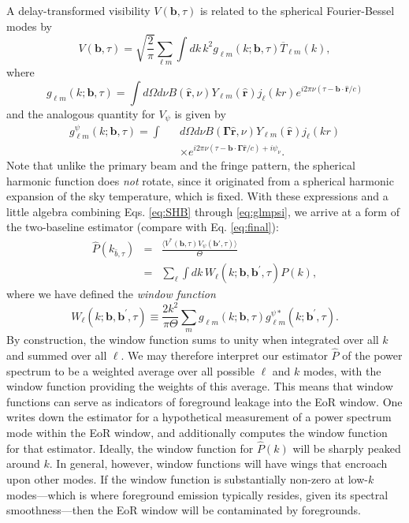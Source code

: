 \documentclass[twocolumn,apj,numberedappendix]{emulateapj}
\renewcommand\[{\begin{equation}}
\renewcommand\]{\end{equation}}
\begin{document}
A delay-transformed visibility $V(\mathbf{b}, \tau) $ is related to the spherical Fourier-Bessel modes by
\begin{equation}
V(\mathbf{b}, \tau) = \sqrt{\frac{2}{\pi}} \sum_{\ell m} \int \! dk\, k^2 g_{\ell m} (k; \mathbf{b}, \tau) \overline{T}_{\ell m} (k),
\end{equation}
where
\begin{equation}
g_{\ell m} (k ; \mathbf{b}, \tau) = \int \! d\Omega d\nu B(\hat{\mathbf{r}},\nu) Y_{\ell m} (\hat{\mathbf{r}}) j_\ell (k r) e^{i 2 \pi \nu (\tau - \mathbf{b}\cdot \hat{\mathbf{r}} / c)}
\end{equation}
and the analogous quantity for $V_\psi$ is given by
\begin{eqnarray}
\label{eq:glmpsi}
g_{\ell m}^\psi (k ; \mathbf{b}, \tau) = \int && d\Omega d\nu B(\boldsymbol \Gamma \hat{\mathbf{r}},\nu) Y_{\ell m} (\hat{\mathbf{r}}) j_\ell (k r) \nonumber \\
&& \times  e^{i 2 \pi \nu (\tau - \mathbf{b}\cdot \boldsymbol \Gamma \hat{\mathbf{r}} / c) + i \psi_\nu}.
\end{eqnarray}
Note that unlike the primary beam and the fringe pattern, the spherical harmonic function does \emph{not} rotate, since it originated from a spherical harmonic expansion of the sky temperature, which is fixed. With these expressions and a little algebra combining Eqs. \eqref{eq:SHB} through \eqref{eq:glmpsi}, we arrive at a form of the two-baseline estimator (compare with Eq. \eqref{eq:final}):
\begin{eqnarray}
\hat{P}(k_{\bar{b}, \tau}) &=& \frac{ \langle V^{*}(\boldsymbol{b},\tau)V_{\psi}(\boldsymbol{b'},\tau) \rangle}{\Theta} \nonumber \\
&=& \sum_\ell \int \!dk\, W_{\ell}(k; \mathbf{b}, \mathbf{b}^\prime , \tau) P(k),
\end{eqnarray}
where we have defined the \emph{window function}
\begin{equation}
W_{\ell}(k; \mathbf{b}, \mathbf{b}^\prime , \tau) \equiv \frac{2 k^2}{\pi \Theta} \sum_m g_{\ell m} (k ; \mathbf{b}, \tau) g_{\ell m}^{\psi*} (k ; \mathbf{b}^\prime, \tau).
\end{equation}
By construction, the window function sums to unity when integrated over all $k$ and summed over all $\ell$. We may therefore interpret our estimator $\hat{P}$ of the power spectrum to be a weighted average over all possible $\ell$ and $k$ modes, with the window function providing the weights of this average. This means that window functions can serve as indicators of foreground leakage into the EoR window. One writes down the estimator for a hypothetical measurement of a power spectrum mode within the EoR window, and additionally computes the window function for that estimator. Ideally, the window function for $\hat{P}(k)$ will be sharply peaked around $k$. In general, however, window functions will have wings that encroach upon other modes. If the window function is substantially non-zero at low-$k$ modes---which is where foreground emission typically resides, given its spectral smoothness---then the EoR window will be contaminated by foregrounds.
\end{document}
